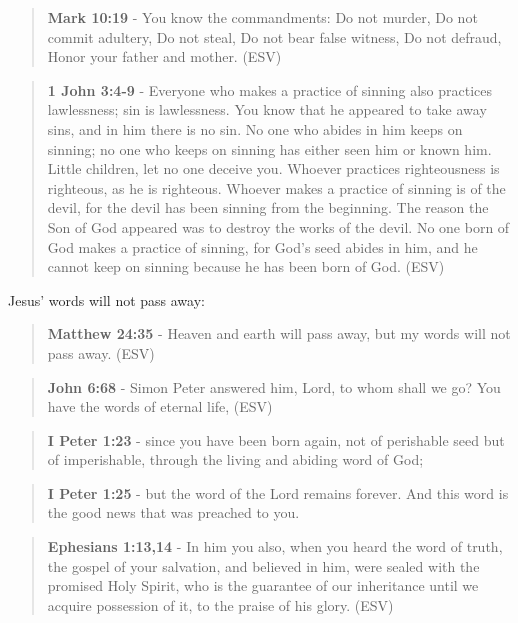 \documentclass[11pt]{article}
\begin{document}
\begin{quote}
\textbf{Mark 10:19} - You know the commandments: Do not murder, Do not commit adultery, Do not steal, Do not bear false witness, Do not defraud, Honor your father and mother. (ESV)
\end{quote}

\begin{quote}
\textbf{1 John 3:4-9} - Everyone who makes a practice of sinning also practices lawlessness; sin is lawlessness.  You know that he appeared to take away sins, and in him there is no sin.  No one who abides in him keeps on sinning; no one who keeps on sinning has either seen him or known him.  Little children, let no one deceive you.  Whoever practices righteousness is righteous, as he is righteous.  Whoever makes a practice of sinning is of the devil, for the devil has been sinning from the beginning.  The reason the Son of God appeared was to destroy the works of the devil.  No one born of God makes a practice of sinning, for God's seed abides in him, and he cannot keep on sinning because he has been born of God.  (ESV)
\end{quote}

Jesus' words will not pass away:

\begin{quote}
\textbf{Matthew 24:35} - Heaven and earth will pass away, but my words will not pass away.  (ESV)
\end{quote}

\begin{quote}
\textbf{John 6:68} -  Simon Peter answered him, Lord, to whom shall we go?  You have the words of eternal life,  (ESV)
\end{quote}

\begin{quote}
\textbf{I Peter 1:23} - since you have been born again, not of perishable seed but of imperishable, through the living and abiding word of God;
\end{quote}

\begin{quote}
\textbf{I Peter 1:25} - but the word of the Lord remains forever. And this word is the good news that was preached to you.
\end{quote}

\begin{quote}
\textbf{Ephesians 1:13,14} -  In him you also, when you heard the word of truth, the gospel of your salvation, and believed in him, were sealed with the promised Holy Spirit, who is the guarantee of our inheritance until we acquire possession of it, to the praise of his glory.  (ESV)
\end{quote}
\end{document}
